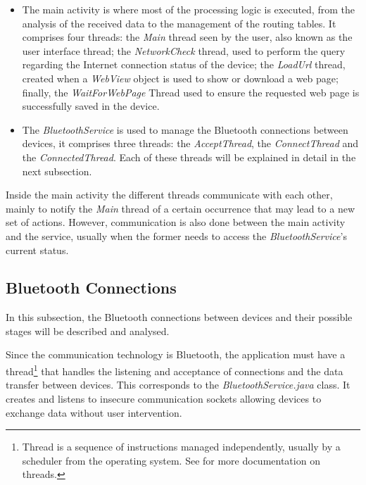 \begin{itemize}

\item The main activity is where most of the processing logic is executed, from the analysis of the received data to the management of the routing tables. It comprises four threads: the \textit{Main} thread seen by the user, also known as the user interface thread; the \textit{NetworkCheck} thread, used to perform the query regarding the Internet connection status of the device; the \textit{LoadUrl} thread, created when a \textit{WebView} object is used to show or download a web page; finally, the \textit{WaitForWebPage} Thread used to ensure the requested web page is successfully saved in the device.

\item The \textit{BluetoothService} is used to manage the Bluetooth connections between devices, it comprises three threads: the \textit{AcceptThread}, the \textit{ConnectThread} and the \textit{ConnectedThread}. Each of these threads will be explained in detail in the next subsection.

\end{itemize}

Inside the main activity the different threads communicate with each other, mainly to notify the \textit{Main} thread of a certain occurrence that may lead to a new set of actions. However, communication is also done between the main activity and the service, usually when the former needs to access the \textit{BluetoothService}'s current status.

\subsection{Bluetooth Connections}
\label{subsec:btconn}

In this subsection, the Bluetooth connections between devices and their possible stages will be described and analysed.

Since the communication technology is Bluetooth, the application must have a thread\footnote{Thread is a sequence of instructions managed independently, usually by a scheduler from the operating system. See \cite{threads} for more documentation on threads.} that handles the listening and acceptance of connections and the data transfer between devices. This corresponds to the \textit{BluetoothService.java} class. It creates and listens to insecure communication sockets allowing devices to exchange data without user intervention.

